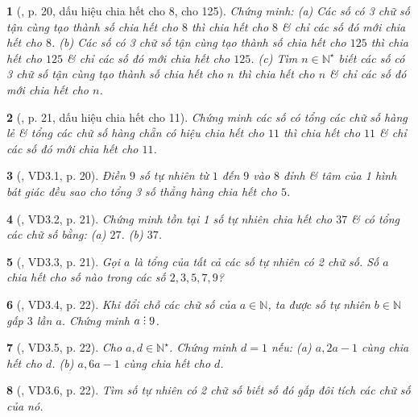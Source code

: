 \documentclass{article}
\newtheorem{baitoan}{}
\DeclareRobustCommand{\divby}{%
	\mathrel{\vbox{\baselineskip.65ex\lineskiplimit0pt\hbox{.}\hbox{.}\hbox{.}}}%
}
\begin{document}
\begin{baitoan}[\cite{TLCT_THCS_Toan_6_so_hoc}, p. 20, dấu hiệu chia hết cho 8, cho 125]
	Chứng minh: (a) Các số có 3 chữ số tận cùng tạo thành số chia hết cho $8$ thì chia hết cho $8$ \& chỉ các số đó mới chia hết cho $8$. (b) Các số có 3 chữ số tận cùng tạo thành số chia hết cho $125$ thì chia hết cho $125$ \& chỉ các số đó mới chia hết cho $125$. (c) Tìm $n\in\mathbb{N}^\star$ biết các số có 3 chữ số tận cùng tạo thành số chia hết cho $n$ thì chia hết cho $n$ \& chỉ các số đó mới chia hết cho $n$.
\end{baitoan}

\begin{baitoan}[\cite{TLCT_THCS_Toan_6_so_hoc}, p. 21, dấu hiệu chia hết cho 11]
	Chứng minh các số có tổng các chữ số hàng lẻ \& tổng các chữ số hàng chẵn có hiệu chia hết cho $11$ thì chia hết cho $11$ \& chỉ các số đó mới chia hết cho $11$.
\end{baitoan}

\begin{baitoan}[\cite{TLCT_THCS_Toan_6_so_hoc}, VD3.1, p. 20]
	Điền $9$ số tự nhiên từ $1$ đến $9$ vào $8$ đỉnh \& tâm của 1 hình bát giác đều sao cho tổng 3 số thẳng hàng chia hết cho $5$.
\end{baitoan}

\begin{baitoan}[\cite{TLCT_THCS_Toan_6_so_hoc}, VD3.2, p. 21]
	Chứng minh tồn tại 1 số tự nhiên chia hết cho $37$ \& có tổng các chữ số bằng: (a) $27$. (b) $37$.
\end{baitoan}

\begin{baitoan}[\cite{TLCT_THCS_Toan_6_so_hoc}, VD3.3, p. 21]
	Gọi $a$ là tổng của tất cả các số tự nhiên có 2 chữ số. Số $a$ chia hết cho số nào trong các số $2,3,5,7,9$?
\end{baitoan}

\begin{baitoan}[\cite{TLCT_THCS_Toan_6_so_hoc}, VD3.4, p. 22]
	Khi đổi chỗ các chữ số của $a\in\mathbb{N}$, ta được số tự nhiên $b\in\mathbb{N}$ gấp $3$ lần $a$. Chứng minh $a\divby9$.
\end{baitoan}

\begin{baitoan}[\cite{TLCT_THCS_Toan_6_so_hoc}, VD3.5, p. 22]
	Cho $a,d\in\mathbb{N}^\star$. Chứng minh $d = 1$ nếu: (a) $a,2a - 1$ cùng chia hết cho $d$. (b) $a,6a - 1$ cùng chia hết cho $d$.
\end{baitoan}

\begin{baitoan}[\cite{TLCT_THCS_Toan_6_so_hoc}, VD3.6, p. 22]
	Tìm số tự nhiên có 2 chữ số biết số đó gấp đôi tích các chữ số của nó.
\end{baitoan}
\end{document}

